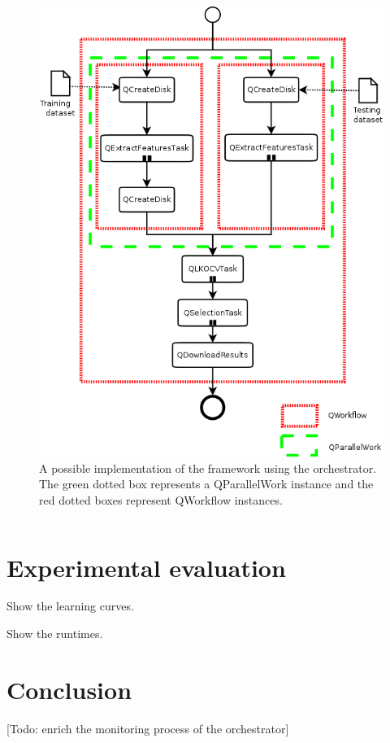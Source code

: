 \documentclass[10pt, conference, compsocconf]{IEEEtran}
\begin{document}
\begin{figure}[h]
\centering
\includegraphics[scale=0.4]{Figures/implementation_vertical.png}
\caption{A possible implementation of the framework using the orchestrator. The green dotted box represents a QParallelWork instance and the red dotted boxes represent QWorkflow instances.}
\label{fig:implementation_diagram}
\end{figure}
\inputminted[baselinestretch=1, bgcolor=LightGray,fontsize=\scriptsize]{python}{selection.py}
\label{fig:implementation_code}


\section{Experimental evaluation} \label{Proof-of-concept}

Show the learning curves.

Show the runtimes.


\section{Conclusion} \label{Conclusion}

[Todo: enrich the monitoring process of the orchestrator]









\end{document}
